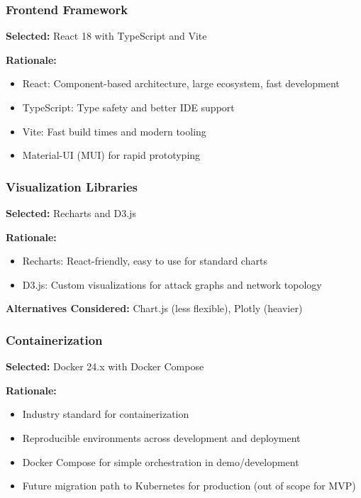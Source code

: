 \documentclass[12pt,a4paper]{article}
\begin{document}
\subsubsection{Frontend Framework}

\textbf{Selected:} React 18 with TypeScript and Vite

\textbf{Rationale:}
\begin{itemize}[leftmargin=1cm,itemsep=0pt]
    \item React: Component-based architecture, large ecosystem, fast development
    \item TypeScript: Type safety and better IDE support
    \item Vite: Fast build times and modern tooling
    \item Material-UI (MUI) for rapid prototyping
\end{itemize}

\subsubsection{Visualization Libraries}

\textbf{Selected:} Recharts and D3.js

\textbf{Rationale:}
\begin{itemize}[leftmargin=1cm,itemsep=0pt]
    \item Recharts: React-friendly, easy to use for standard charts
    \item D3.js: Custom visualizations for attack graphs and network topology
\end{itemize}

\textbf{Alternatives Considered:} Chart.js (less flexible), Plotly (heavier)

\subsubsection{Containerization}

\textbf{Selected:} Docker 24.x with Docker Compose

\textbf{Rationale:}
\begin{itemize}[leftmargin=1cm,itemsep=0pt]
    \item Industry standard for containerization
    \item Reproducible environments across development and deployment
    \item Docker Compose for simple orchestration in demo/development
    \item Future migration path to Kubernetes for production (out of scope for MVP)
\end{itemize}
\end{document}
